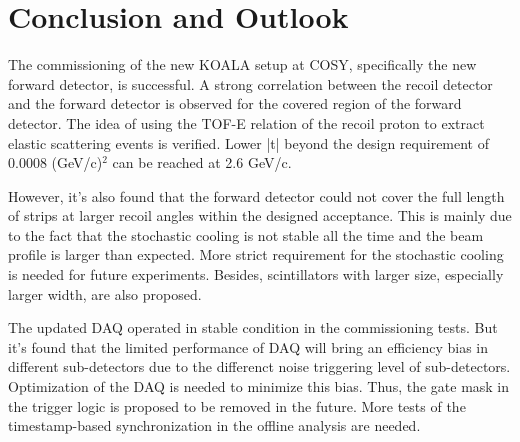 \documentclass[number,5p]{elsarticle}
\begin{document}
\section{Conclusion and Outlook}
\label{sec:conclusion}

The commissioning of the new KOALA setup at COSY, specifically the new forward detector, is successful.
A strong correlation between the recoil detector and the forward detector is
observed for the covered region of the forward detector.
The idea of using the TOF-E relation of the recoil proton to extract elastic
scattering events is verified.
Lower |t| beyond the design requirement of 0.0008 (GeV/c)$^2$ can be reached at 2.6 GeV/c. 

However, it's also found that the forward detector could not cover the full
length of strips at larger recoil angles within the designed acceptance.
This is mainly due to the fact that the stochastic cooling is not stable all the time
and the beam profile is larger than expected.
More strict requirement for the stochastic cooling is needed for future experiments.
Besides, scintillators with larger size, especially larger width, are also proposed.

The updated DAQ operated in stable condition in the commissioning tests.
But it's found that the limited performance of DAQ will bring an efficiency bias in different
sub-detectors due to the differenct noise triggering level of sub-detectors.
Optimization of the DAQ is needed to minimize this bias.
Thus, the gate mask in the trigger logic is proposed to be removed in the future.
More tests of the timestamp-based synchronization in the offline analysis are needed.



\end{document}
